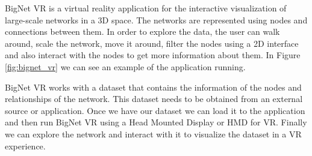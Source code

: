 %
%



BigNet VR is a virtual reality application for the interactive visualization of large-scale networks in a 3D space. The networks are represented using nodes and connections between them. In order to explore the data, the user can walk around, scale the network, move it around, filter the nodes using a 2D interface and also interact with the nodes to get more information about them. In Figure \ref{fig:bignet_vr} we can see an example of the application running.

BigNet VR works with a dataset that contains the information of the nodes and relationships of the network. This dataset needs to be obtained from an external source or application. Once we have our dataset we can load it to the application and then run BigNet VR using a Head Mounted Display or HMD for VR. Finally we can explore the network and interact with it to visualize the dataset in a VR experience.

